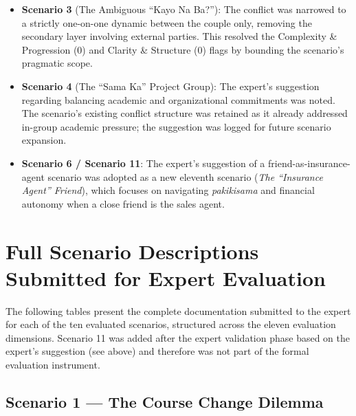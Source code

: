 \begin{itemize}
  \item \textbf{Scenario 3} (The Ambiguous ``Kayo Na Ba?''): The conflict was narrowed to a
  strictly one-on-one dynamic between the couple only, removing the secondary layer involving
  external parties. This resolved the Complexity \& Progression (0) and Clarity \& Structure (0)
  flags by bounding the scenario's pragmatic scope.
 
  \item \textbf{Scenario 4} (The ``Sama Ka'' Project Group): The expert's suggestion regarding
  balancing academic and organizational commitments was noted. The scenario's existing conflict
  structure was retained as it already addressed in-group academic pressure; the suggestion was
  logged for future scenario expansion.
 
  \item \textbf{Scenario 6 / Scenario 11}: The expert's suggestion of a friend-as-insurance-agent
  scenario was adopted as a new eleventh scenario (\textit{The ``Insurance Agent'' Friend}),
  which focuses on navigating \textit{pakikisama} and financial autonomy when a close friend
  is the sales agent.
\end{itemize}
 
 
\section{Full Scenario Descriptions Submitted for Expert Evaluation}
\label{sec:app_scenarios}
 
The following tables present the complete documentation submitted to the expert for each of the
ten evaluated scenarios, structured across the eleven evaluation dimensions. Scenario 11 was added
after the expert validation phase based on the expert's suggestion (see above) and therefore
was not part of the formal evaluation instrument.
 
\subsection*{Scenario 1 --- The Course Change Dilemma}
 
